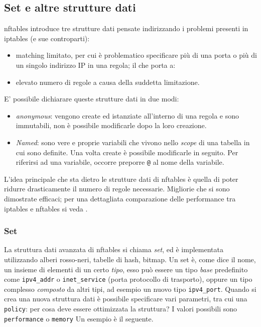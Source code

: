 \subsection{Set e altre strutture dati}
nftables introduce tre strutture dati pensate indirizzando i problemi
presenti in iptables (e sue controparti):
\begin{itemize}
	\item matching limitato, per cui è problematico specificare più di una porta
	      o più di un singolo indirizzo IP in una regola; il che porta a:
	\item elevato numero di regole a causa della suddetta limitazione.
\end{itemize}
E' possibile dichiarare queste strutture dati in due modi:
\begin{itemize}
	\item \textit{anonymous}: vengono create ed istanziate all'interno di una regola
	      e sono immutabili, non è possibile modificarle dopo la loro creazione.
	\item \textit{Named}: sono vere e proprie variabili che vivono nello \textit{scope}
	      di una tabella in cui sono definite. Una volta create è possibile modificarle
	      in seguito. Per riferirsi ad una variabile, occorre preporre \texttt{@} al nome
	      della variabile.
\end{itemize}
L'idea principale che sta dietro le strutture dati di nftables  è quella di poter
ridurre drasticamente il numero di regole necessarie. Migliorie che si sono
dimostrate efficaci; per una dettagliata comparazione delle performance tra
iptables e nftables si veda \cite{nftables-iptables-thesis}.

\subsubsection{Set}
La struttura dati avanzata di nftables si chiama \textit{set}, ed è implementata
utilizzando alberi rosso-neri, tabelle di hash, bitmap.
Un set è, come dice il nome, un insieme di elementi di un certo \textit{tipo},
esso può essere un tipo \textit{base} predefinito come \texttt{ipv4\_addr} o
\texttt{inet\_service} (porta protocollo di trasporto), oppure un tipo complesso
\textit{composto} da altri tipi, ad esempio un nuovo tipo \texttt{ipv4\_port}.
Quando si crea una nuova struttura dati è possibile specificare vari parametri,
tra cui una \texttt{policy}: per cosa deve essere ottimizzata la struttura?
I valori possibili sono \texttt{performance} o \texttt{memory}
Un esempio è il seguente.

